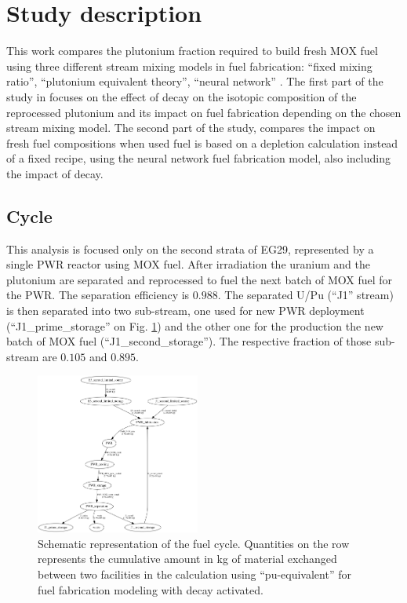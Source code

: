 \documentclass{anstrans}
\begin{document}
\section{Study description}

This work compares the plutonium fraction required to build fresh MOX fuel
using three different stream mixing models in fuel fabrication: ``fixed mixing
ratio'', ``plutonium equivalent theory'', ``neural network'' \cite{Leniau2015125}.
The first part of the study in focuses on the effect of decay on the isotopic
composition of the reprocessed plutonium and its impact on fuel fabrication
depending on the chosen stream mixing model.  The second part of the study,
compares the impact on fresh fuel compositions when used fuel is based on a
depletion calculation instead of a fixed recipe, using the neural network fuel
fabrication model, also including the impact of decay.


\subsection{Cycle}

This analysis is focused only on the second strata of EG29, represented by a
single PWR reactor using MOX fuel. After irradiation the uranium and the
plutonium are separated and reprocessed to fuel the next batch of MOX fuel for
the PWR. The separation efficiency is $0.988$. The separated U/Pu (``J1''
stream) is then separated into two sub-stream, one used for new PWR deployment
(``J1\_prime\_storage'' on Fig. \ref{fig:flow}) and the other one for the
production the new batch of MOX fuel (``J1\_second\_storage''). The respective
fraction of those sub-stream are $0.105$ and $0.895$.

\begin{figure}[ht] %
  \centering
  \includegraphics[width=0.48\textwidth]{flow}
  \caption{Schematic representation of the fuel cycle. Quantities on the row
  represents the cumulative amount in kg of material exchanged between two
  facilities in the calculation using ``pu-equivalent'' for fuel fabrication
  modeling with decay activated.}
  \label{fig:flow}
\end{figure}
\end{document}
